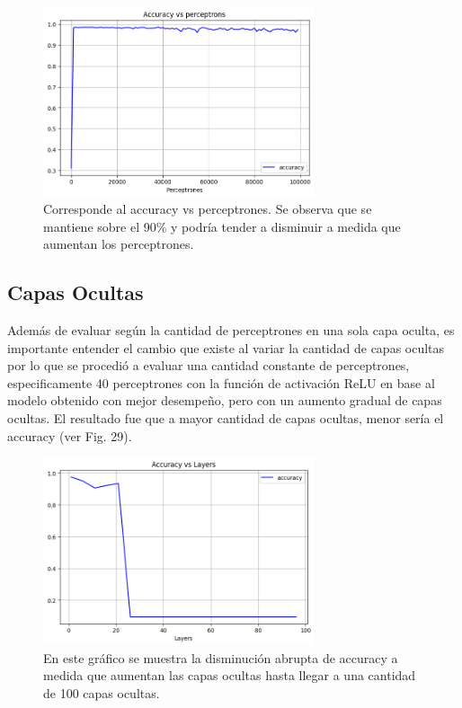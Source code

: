 \documentclass[journal]{IEEEtai}
\begin{document}
\begin{figure}[H]
\centering
\includegraphics[width=8cm]{img/exp/onlyAcc.png}
\caption{Corresponde al accuracy vs perceptrones. Se observa que se mantiene sobre el 90\% y podría tender a disminuir a medida que aumentan los perceptrones.}
\label{fig: expBig}
\end{figure}

\subsection{Capas Ocultas}

Además de evaluar según la cantidad de perceptrones en una sola capa oculta, es importante entender el cambio que existe al variar la cantidad de capas ocultas por lo que se procedió a evaluar una cantidad constante de perceptrones, especificamente 40 perceptrones con la función de activación ReLU en base al modelo obtenido con mejor desempeño, pero con un aumento gradual de capas ocultas. El resultado fue que a mayor cantidad de capas ocultas, menor sería el accuracy (ver Fig. 29).

\begin{figure}[h!]
\centering
\includegraphics[width=8cm]{img/exp/layersExp.png}
\caption{En este gráfico se muestra la disminución abrupta de accuracy a medida que aumentan las capas ocultas hasta llegar a una cantidad de 100 capas ocultas.}
\label{fig: layersExp}
\end{figure}
\end{document}
